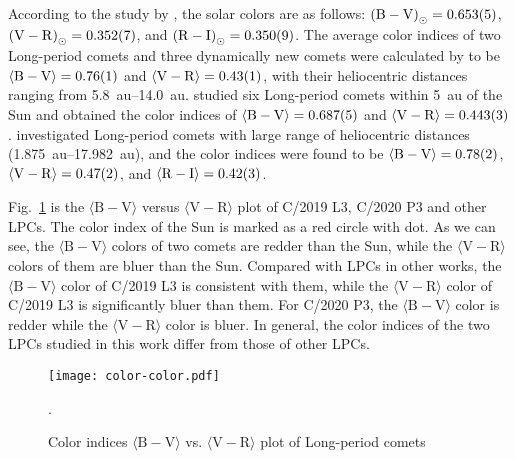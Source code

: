 According to the study by \cite{ramirez_ubvric_2012}, the solar colors are as follows: 
${(\mathrm{B-V})}_{\odot} = \num{0.653 +- 0.005}$, 
${(\mathrm{V-R})}_{\odot} = \num{0.352 +- 0.007}$, and 
${(\mathrm{R-I})}_{\odot} = \num{0.350 +- 0.009}$. 
The average color indices of two Long-period comets and three dynamically new comets were calculated by \cite{meech_activity_2009} to be 
$\langle \mathrm{B-V} \rangle = \num{0.76 +- 0.01}$ and 
$\langle \mathrm{V-R} \rangle = \num{0.43 +- 0.01}$, 
with their heliocentric distances ranging from \qtyrange{5.8}{14.0}{\astronomicalunit}. 
\cite{solontoi_ensemble_2012} studied six Long-period comets within \qty{5}{\astronomicalunit} of the Sun and obtained the color indices of 
$\langle \mathrm{B-V} \rangle = \num{0.687 +- 0.005}$ and 
$\langle \mathrm{V-R} \rangle = \num{0.443 +- 0.003}$. 
\cite{jewittCOLORSYSTEMATICSCOMETS2015} investigated Long-period comets with large range of heliocentric distances (\qtyrange{1.875}{17.982}{\astronomicalunit}), and the color indices were found to be 
$\langle \mathrm{B-V} \rangle = \num{0.78 +- 0.02}$, 
$\langle \mathrm{V-R} \rangle = \num{0.47 +- 0.02}$, and 
$\langle \mathrm{R-I} \rangle = \num{0.42 +- 0.03}$. 

Fig.~\ref{fig:color-color} is the $\langle \mathrm{B-V} \rangle$ versus $\langle \mathrm{V-R} \rangle$ plot of C/2019 L3, C/2020 P3 and other LPCs. 
The color index of the Sun \citep{ramirez_ubvric_2012} is marked as a red circle with dot. 
As we can see, the $\langle \mathrm{B-V} \rangle$ colors of two comets are redder than the Sun, while the $\langle \mathrm{V-R} \rangle$ colors of them are bluer than the Sun. 
Compared with LPCs in other works, the $\langle \mathrm{B-V} \rangle$ color of C/2019 L3 is consistent with them, while the $\langle \mathrm{V-R} \rangle$ color of C/2019 L3 is significantly bluer than them. For C/2020 P3, the $\langle \mathrm{B-V} \rangle$ color is redder while the $\langle \mathrm{V-R} \rangle$ color is bluer. 
In general, the color indices of the two LPCs studied in this work differ from those of other LPCs. 

\begin{figure}
    \centering
    \texttt{[image: color-color.pdf]}
    \caption{Color indices $\langle \mathrm{B-V} \rangle$ vs. $\langle \mathrm{V-R} \rangle$ plot of Long-period comets}.\label{fig:color-color}
\end{figure}

